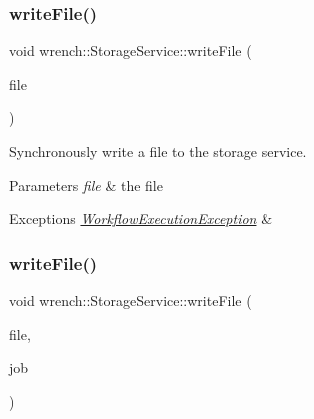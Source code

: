 \subsubsection{\texorpdfstring{write\+File()}{writeFile()}\hspace{0.1cm}{\footnotesize\ttfamily [2/3]}}
{\footnotesize\ttfamily void wrench\+::\+Storage\+Service\+::write\+File (\begin{DoxyParamCaption}\item[{\hyperlink{classwrench_1_1_workflow_file}{Workflow\+File} $\ast$}]{file }\end{DoxyParamCaption})\hspace{0.3cm}{\ttfamily [virtual]}}



Synchronously write a file to the storage service. 


\begin{DoxyParams}{Parameters}
{\em file} & the file\\
\hline
\end{DoxyParams}

\begin{DoxyExceptions}{Exceptions}
{\em \hyperlink{classwrench_1_1_workflow_execution_exception}{Workflow\+Execution\+Exception}} & \\
\hline
\end{DoxyExceptions}
\mbox{\label{classwrench_1_1_storage_service_a60e325584a9a9d450c4c51e8ec7ba96e}} 
\subsubsection{\texorpdfstring{write\+File()}{writeFile()}\hspace{0.1cm}{\footnotesize\ttfamily [3/3]}}
{\footnotesize\ttfamily void wrench\+::\+Storage\+Service\+::write\+File (\begin{DoxyParamCaption}\item[{\hyperlink{classwrench_1_1_workflow_file}{Workflow\+File} $\ast$}]{file,  }\item[{\hyperlink{classwrench_1_1_workflow_job}{Workflow\+Job} $\ast$}]{job }\end{DoxyParamCaption})\hspace{0.3cm}{\ttfamily [virtual]}}




